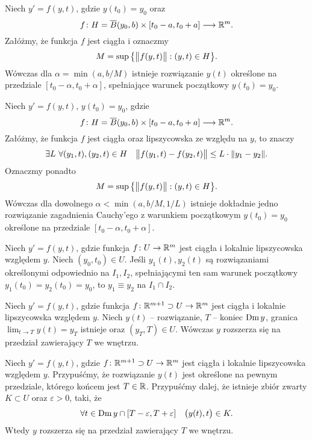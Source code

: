 
\begin{theorem}[Peano]
  Niech $y' = f(y,t)$, gdzie $y(t_0) = y_0$ oraz
  \[
    f \colon H = \overline{B} (y_0, b) \times [t_0 - a, t_0 + a] \longrightarrow \R^m.
  \]
  Załóżmy, że funkcja $f$ jest ciągła i oznaczmy
  \[
    M = \sup \big\{ \norm[\big]{f(y,t)} : (y, t) \in H \big\}.
  \]
  Wówczas dla $\alpha = \min(a, b/M)$ istnieje rozwiązanie $y(t)$ określone na
  przedziale $[t_0 - \alpha, t_0 + \alpha]$, spełniające warunek początkowy $y(t_0) = y_0$.
\end{theorem}

\begin{theorem}
  Niech $y' = f(y,t)$, $y(t_0) = y_0$, gdzie
  \[
    f \colon H = \overline{B} (y_0, b) \times [t_0 - a, t_0 + a] \longrightarrow \R^m.
  \]
  Załóżmy, że funkcja $f$ jest ciągła oraz lipszycowska ze względu na $y$, to znaczy
  \[
    \exists L \ \forall (y_1,t), (y_2,t) \in H \quad
    \norm[\big]{f(y_1,t) - f(y_2,t)} \leq L \cdot \norm{y_1 - y_2}.
  \]
  Oznaczmy ponadto
  \[
    M = \sup \big\{ \norm[\big]{f(y,t)} : (y, t) \in H \big\}.
  \]
  Wówczas dla dowolnego $\alpha < \min(a, b/M, 1/L)$ istnieje dokładnie jedno rozwiązanie
  zagadnienia Cauchy'ego z warunkiem początkowym $y(t_0) = y_0$ określone na przedziale
  $[t_0 - \alpha, t_0 + \alpha]$.
\end{theorem}

\begin{lemma}
  Niech $y' = f(y,t)$, gdzie funkcja $f \colon U \to \R^m$ jest ciągła i lokalnie lipszycowska
  względem $y$. Niech $(y_0,t_0) \in U$. Jeśli $y_1(t), y_2(t)$ są rozwiązaniami określonymi
  odpowiednio na $I_1, I_2$, spełniającymi ten sam warunek początkowy $y_1(t_0) = y_2(t_0) = y_0$,
  to $y_1 \equiv y_2$ na $I_1 \cap I_2$.
\end{lemma}

\begin{lemma}
  Niech $y' = f(y,t)$, gdzie funkcja $f \colon \R^{m+1} \supset U \to \R^m$ jest ciągła i lokalnie
  lipszycowska względem $y$. Niech $y(t)$ -- rozwiązanie, $T$ -- koniec $\Domain y$, granica
  $\lim_{t \to T} y(t) = y_T$ istnieje oraz $(y_T, T) \in U$. Wówczas $y$ rozszerza się na przedział
  zawierający $T$ we wnętrzu.
\end{lemma}

\begin{theorem} \label{T: TOPK}
  Niech $y' = f(y,t)$, gdzie $f \colon \R^{m+1} \supset U \to \R^m$ jest ciągła i lokalnie
  lipszycowska względem $y$. Przypuśćmy, że rozwiązanie $y(t)$ jest określone na pewnym przedziale,
  którego końcem jest $T \in \R$. Przypuśćmy dalej, że istnieje zbiór zwarty $K \subset U$ oraz
  $\varepsilon > 0$, taki, że
  \[
    \forall t \in \Domain y \cap [T - \varepsilon, T + \varepsilon] \quad \p[\big]{y(t), t} \in K.
  \]
  Wtedy $y$ rozszerza się na przedział zawierający $T$ we wnętrzu.
\end{theorem}

